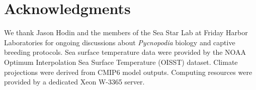 \documentclass[11pt]{article}
\begin{document}












\section*{Acknowledgments}

We thank Jason Hodin and the members of the Sea Star Lab at Friday Harbor Laboratories for ongoing discussions about \textit{Pycnopodia} biology and captive breeding protocols. Sea surface temperature data were provided by the NOAA Optimum Interpolation Sea Surface Temperature (OISST) dataset. Climate projections were derived from CMIP6 model outputs. Computing resources were provided by a dedicated Xeon W-3365 server.

\clearpage



\end{document}
